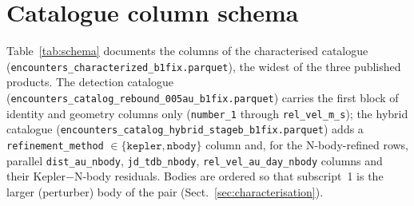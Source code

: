 \documentclass{aa}
\begin{document}



\appendix

\section{Catalogue column schema}
\label{sec:schema}

Table~\ref{tab:schema} documents the columns of the characterised catalogue
(\texttt{encounters\_characterized\_b1fix.parquet}), the widest of the three
published products. The detection catalogue
(\texttt{encounters\_catalog\_rebound\_005au\_b1fix.parquet}) carries the first block of
identity and geometry columns only (\texttt{number\_1} through
\texttt{rel\_vel\_m\_s}); the hybrid catalogue
(\texttt{encounters\_catalog\_hybrid\_stageb\_b1fix.parquet}) adds a
\texttt{refinement\_method} $\in\{\texttt{kepler},\texttt{nbody}\}$ column and,
for the N-body-refined rows, parallel \texttt{dist\_au\_nbody},
\texttt{jd\_tdb\_nbody}, \texttt{rel\_vel\_au\_day\_nbody} columns and their
Kepler$-$N-body residuals. Bodies are ordered so that subscript~1 is the larger
(perturber) body of the pair (Sect.~\ref{sec:characterisation}).
\end{document}
